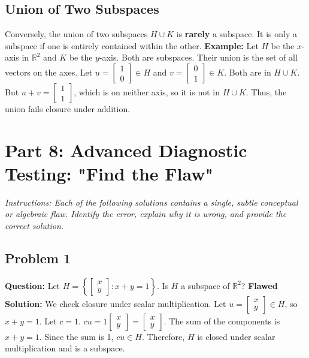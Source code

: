 \documentclass[12pt]{article}
\begin{document}
\subsection{Union of Two Subspaces}
Conversely, the union of two subspaces $H \cup K$ is \textbf{rarely} a subspace. It is only a subspace if one is entirely contained within the other. 
\textbf{Example:} Let $H$ be the $x$-axis in $\mathbb{R}^2$ and $K$ be the $y$-axis. Both are subspaces. Their union is the set of all vectors on the axes. Let $u = \begin{bmatrix} 1 \\ 0 \end{bmatrix} \in H$ and $v = \begin{bmatrix} 0 \\ 1 \end{bmatrix} \in K$. Both are in $H \cup K$. But $u+v = \begin{bmatrix} 1 \\ 1 \end{bmatrix}$, which is on neither axis, so it is not in $H \cup K$. Thus, the union fails closure under addition.

\newpage

\section{Part 8: Advanced Diagnostic Testing: "Find the Flaw"}
\textit{Instructions: Each of the following solutions contains a single, subtle conceptual or algebraic flaw. Identify the error, explain why it is wrong, and provide the correct solution.}

\subsection{Problem 1}
\textbf{Question:} Let $H = \left\{ \begin{bmatrix} x \\ y \end{bmatrix} : x + y = 1 \right\}$. Is $H$ a subspace of $\mathbb{R}^2$?
\textbf{Flawed Solution:}
We check closure under scalar multiplication. Let $u = \begin{bmatrix} x \\ y \end{bmatrix} \in H$, so $x+y=1$. Let $c=1$.
$cu = 1 \begin{bmatrix} x \\ y \end{bmatrix} = \begin{bmatrix} x \\ y \end{bmatrix}$.
The sum of the components is $x+y = 1$. Since the sum is 1, $cu \in H$. 
Therefore, $H$ is closed under scalar multiplication and is a subspace.
\end{document}
